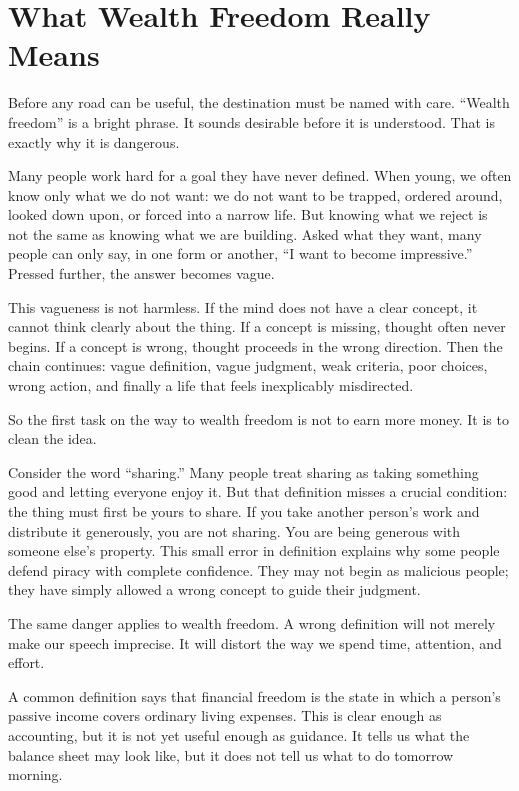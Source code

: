 \chapter{What Wealth Freedom Really Means}

Before any road can be useful, the destination must be named with care. ``Wealth freedom'' is a bright phrase. It sounds desirable before it is understood. That is exactly why it is dangerous.

Many people work hard for a goal they have never defined. When young, we often know only what we do not want: we do not want to be trapped, ordered around, looked down upon, or forced into a narrow life. But knowing what we reject is not the same as knowing what we are building. Asked what they want, many people can only say, in one form or another, ``I want to become impressive.'' Pressed further, the answer becomes vague.

This vagueness is not harmless. If the mind does not have a clear concept, it cannot think clearly about the thing. If a concept is missing, thought often never begins. If a concept is wrong, thought proceeds in the wrong direction. Then the chain continues: vague definition, vague judgment, weak criteria, poor choices, wrong action, and finally a life that feels inexplicably misdirected.

So the first task on the way to wealth freedom is not to earn more money. It is to clean the idea.

Consider the word ``sharing.'' Many people treat sharing as taking something good and letting everyone enjoy it. But that definition misses a crucial condition: the thing must first be yours to share. If you take another person's work and distribute it generously, you are not sharing. You are being generous with someone else's property. This small error in definition explains why some people defend piracy with complete confidence. They may not begin as malicious people; they have simply allowed a wrong concept to guide their judgment.

The same danger applies to wealth freedom. A wrong definition will not merely make our speech imprecise. It will distort the way we spend time, attention, and effort.

A common definition says that financial freedom is the state in which a person's passive income covers ordinary living expenses. This is clear enough as accounting, but it is not yet useful enough as guidance. It tells us what the balance sheet may look like, but it does not tell us what to do tomorrow morning.

